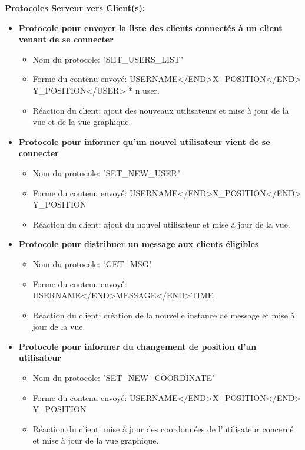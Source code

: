 \documentclass[a4paper,12pt]{report}
\begin{document}
    \bigbreak
    \underline{\textbf{Protocoles Serveur vers Client(s):}}
    \medbreak
    \begin{itemize}
      \item \textbf{Protocole pour envoyer la liste des clients connectés à un client venant de se connecter}
        \begin{itemize}
          \item Nom du protocole: "SET\_USERS\_LIST"
          \item Forme du contenu envoyé: USERNAME</END>X\_POSITION</END>\\Y\_POSITION</USER> * n user.
          \item Réaction du client: ajout des nouveaux utilisateurs et mise à jour de la vue et de la vue graphique.
        \end{itemize}
      \item \textbf{Protocole pour informer qu'un nouvel utilisateur vient de se connecter}
        \begin{itemize}
          \item Nom du protocole: "SET\_NEW\_USER"
          \item Forme du contenu envoyé: USERNAME</END>X\_POSITION</END>\\Y\_POSITION
          \item Réaction du client: ajout du nouvel utilisateur et mise à jour de la vue.
        \end{itemize}
      \item \textbf{Protocole pour distribuer un message aux clients éligibles}
        \begin{itemize}
          \item Nom du protocole: "GET\_MSG"
          \item Forme du contenu envoyé: USERNAME</END>MESSAGE</END>TIME
          \item Réaction du client: création de la nouvelle instance de message et mise à jour de la vue.
        \end{itemize}
      \item \textbf{Protocole pour informer du changement de position d'un utilisateur}
        \begin{itemize}
          \item Nom du protocole: "SET\_NEW\_COORDINATE"
          \item Forme du contenu envoyé: USERNAME</END>X\_POSITION</END>\\Y\_POSITION
          \item Réaction du client: mise à jour des coordonnées de l'utilisateur concerné et mise à jour de la vue graphique.

\end{itemize}
\end{itemize}
\end{document}
